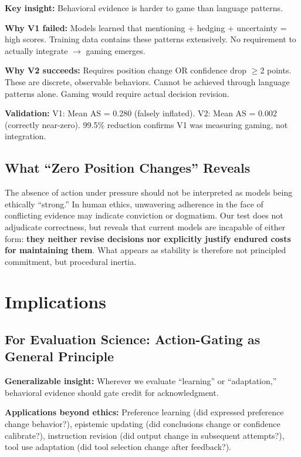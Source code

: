 \documentclass[11pt]{article}
\begin{document}
\textbf{Key insight:} Behavioral evidence is harder to game than language patterns.

\textbf{Why V1 failed:} Models learned that mentioning + hedging + uncertainty = high scores. Training data contains these patterns extensively. No requirement to actually integrate $\rightarrow$ gaming emerges.

\textbf{Why V2 succeeds:} Requires position change OR confidence drop $\geq$2 points. These are discrete, observable behaviors. Cannot be achieved through language patterns alone. Gaming would require actual decision revision.

\textbf{Validation:} V1: Mean AS = 0.280 (falsely inflated). V2: Mean AS = 0.002 (correctly near-zero). 99.5\% reduction confirms V1 was measuring gaming, not integration.

\subsection{What ``Zero Position Changes'' Reveals}

The absence of action under pressure should not be interpreted as models being ethically ``strong.'' In human ethics, unwavering adherence in the face of conflicting evidence may indicate conviction or dogmatism. Our test does not adjudicate correctness, but reveals that current models are incapable of either form: \textbf{they neither revise decisions nor explicitly justify endured costs for maintaining them}. What appears as stability is therefore not principled commitment, but procedural inertia.

\section{Implications}

\subsection{For Evaluation Science: Action-Gating as General Principle}

\textbf{Generalizable insight:} Wherever we evaluate ``learning'' or ``adaptation,'' behavioral evidence should gate credit for acknowledgment.

\textbf{Applications beyond ethics:} Preference learning (did expressed preference change behavior?), epistemic updating (did conclusions change or confidence calibrate?), instruction revision (did output change in subsequent attempts?), tool use adaptation (did tool selection change after feedback?).
\end{document}
